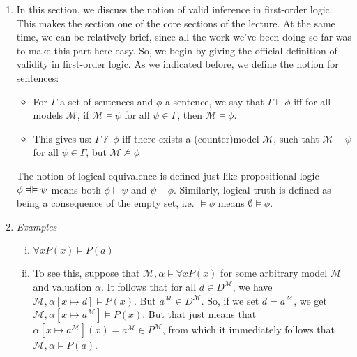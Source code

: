 	\begin{enumerate}[\thesection.1]


		\item In this section, we discuss the notion of valid inference in first-order logic. This makes the section one of the core sections of the lecture. At the same time, we can be relatively brief, since all the work we've been doing so-far was to make this part here easy. So, we begin by giving the official definition of validity in first-order logic. As we indicated before, we define the notion for sentences:
		
		\begin{itemize}
		
			\item For $\Gamma$ a set of sentences and $\phi$ a sentence, we say that $\Gamma\vDash\phi$ iff for all models $\mathcal{M}$, if $\mathcal{M}\vDash\psi$ for all $\psi\in\Gamma$, then $\mathcal{M}\vDash\phi$.
			
			\item This gives us:  $\Gamma\nvDash\phi$ iff there exists a (counter)model $\mathcal{M}$, such taht $\mathcal{M}\vDash\psi$ for all $\psi\in\Gamma$, but $\mathcal{M}\nvDash\phi$
		
		\end{itemize}
		
		The notion of logical equivalence is defined just like propositional logic $\phi\equi \psi$ means both $\phi\vDash\psi$ and $\psi\vDash\phi$. Similarly, logical truth is defined as being a consequence of the empty set, i.e. $\vDash\phi$ means $\emptyset\vDash\phi$.
		
		\item \emph{Examples}
		
		\begin{enumerate}[(i)]
		
		\item $\forall xP(x)\vDash P(a)$
		
		\item[] To see this, suppose that $\mathcal{M},\alpha\vDash\forall xP(x)$ for some arbitrary model $\mathcal{M}$ and valuation $\alpha$. It follows that for all $d\in D^\mathcal{M}$, we have $\mathcal{M},\alpha[x\mapsto d]\vDash P(x)$. But $a^\mathcal{M}\in D^\mathcal{M}$. So, if we set $d=a^\mathcal{M}$, we get $\mathcal{M},\alpha[x\mapsto a^\mathcal{M}]\vDash P(x)$. But that just means that $\alpha[x\mapsto a^\mathcal{M}](x)=a^\mathcal{M}\in P^\mathcal{M}$, from which it immediately follows that $\mathcal{M},\alpha\vDash P(a)$.
		

\end{enumerate}
\end{enumerate}
